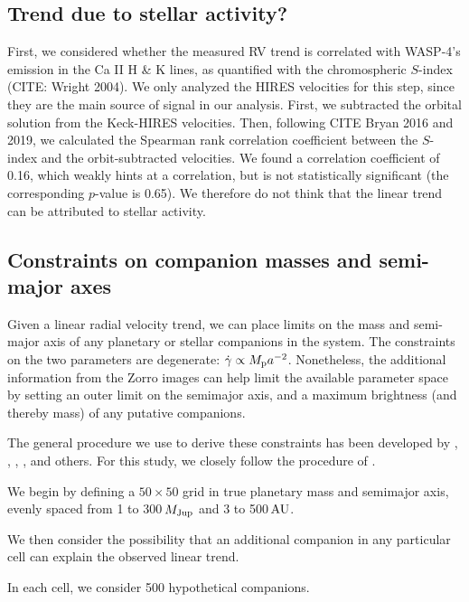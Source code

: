 \documentclass[RNAAS]{aastex62}
\begin{document}
\subsection{Trend due to stellar activity?}

First, we considered whether the measured RV trend is correlated with
WASP-4's emission in the Ca II H \& K lines, as quantified with the
chromospheric $S$-index (CITE: Wright 2004).  We only analyzed the
HIRES velocities for this step, since they are the main source of
signal in our analysis.  First, we subtracted the orbital solution
from the Keck-HIRES velocities.  Then, following CITE Bryan 2016 and
2019, we calculated the Spearman rank correlation coefficient between
the $S$-index and the orbit-subtracted velocities.  We found a
correlation coefficient of 0.16, which weakly hints at a correlation,
but is not statistically significant (the corresponding $p$-value is
0.65).  We therefore do not think that the linear trend can be
attributed to stellar activity.

\subsection{Constraints on companion masses and semi-major axes}

Given a linear radial velocity trend, we can place limits on the mass
and semi-major axis of any planetary or stellar companions in the
system.
The constraints on the two parameters are degenerate: $\dot{\gamma}
\propto M_{\rm p} a^{-2}$.
Nonetheless, the additional information from the Zorro images can help
limit the available parameter space by setting an outer limit on the
semimajor axis, and a maximum brightness (and thereby mass) of any
putative companions.

The general procedure we use to derive these constraints has been developed by
\citet{wright_linear_trends_2007}, \citet{montet_trends_2014},
\citet{knutson_friends_2014}, \citet{bryan_statistics_2016,bryan_excess_2019},
and others.
For this study, we closely follow the procedure of \citet{bryan_excess_2019}.

We begin by defining a $50\times50$ grid in true planetary mass and semimajor
axis, evenly spaced from 1 to 300$\,$$M_{\rm Jup}$ and 3 to 500$\,$${\rm AU}$.

We then consider the possibility that an additional companion in any particular
cell can explain the observed linear trend.

In each cell, we consider 500 hypothetical companions.
\end{document}
